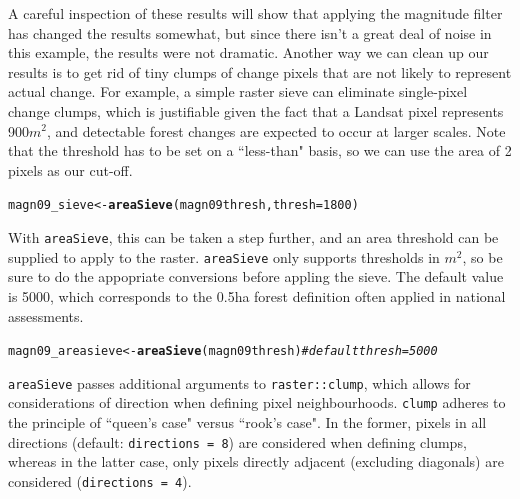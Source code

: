 \documentclass{article}\usepackage[]{graphicx}\usepackage[]{color}
\makeatletter
\newcommand{\hlnum}[1]{\textcolor[rgb]{0.686,0.059,0.569}{#1}}%
\newcommand{\hlcom}[1]{\textcolor[rgb]{0.678,0.584,0.686}{\textit{#1}}}%
\newcommand{\hlstd}[1]{\textcolor[rgb]{0.345,0.345,0.345}{#1}}%
\newcommand{\hlkwb}[1]{\textcolor[rgb]{0.69,0.353,0.396}{#1}}%
\newcommand{\hlkwc}[1]{\textcolor[rgb]{0.333,0.667,0.333}{#1}}%
\newcommand{\hlkwd}[1]{\textcolor[rgb]{0.737,0.353,0.396}{\textbf{#1}}}%
\newenvironment{kframe}{%
 \def\at@end@of@kframe{}%
 \ifinner\ifhmode%
  \def\at@end@of@kframe{\end{minipage}}%
  \begin{minipage}{\columnwidth}%
 \fi\fi%
 \def\FrameCommand##1{\hskip\@totalleftmargin \hskip-\fboxsep
 \colorbox{shadecolor}{##1}\hskip-\fboxsep
     \hskip-\linewidth \hskip-\@totalleftmargin \hskip\columnwidth}%
 \MakeFramed {\advance\hsize-\width
   \@totalleftmargin\z@ \linewidth\hsize
   \@setminipage}}%
 {\par\unskip\endMakeFramed%
 \at@end@of@kframe}
\newenvironment{knitrout}{}{} %
\def\code#1{\texttt{#1}}
\makeatother
\begin{document}
A careful inspection of these results will show that applying the magnitude filter has changed the results somewhat, but since there isn't a great deal of noise in this example, the results were not dramatic. Another way we can clean up our results is to get rid of tiny clumps of change pixels that are not likely to represent actual change. For example, a simple raster sieve can eliminate single-pixel change clumps, which is justifiable given the fact that a Landsat pixel represents 900$m^2$, and detectable forest changes are expected to occur at larger scales. Note that the threshold has to be set on a ``less-than" basis, so we can use the area of 2 pixels as our cut-off.

\begin{knitrout}
\color{fgcolor}\begin{kframe}
\begin{alltt}
\hlstd{magn09_sieve} \hlkwb{<-} \hlkwd{areaSieve}\hlstd{(magn09thresh,} \hlkwc{thresh} \hlstd{=} \hlnum{1800}\hlstd{)}
\end{alltt}


{\ttfamily\noindent\itshape\color{messagecolor}{\#\# Loading required package: igraph}}\end{kframe}
\end{knitrout}


With \code{areaSieve}, this can be taken a step further, and an area threshold can be supplied to apply to the raster. \code{areaSieve} only supports thresholds in $m^2$, so be sure to do the appopriate conversions before appling the sieve. The default value is 5000, which corresponds to the 0.5ha forest definition often applied in national assessments.

\begin{knitrout}
\color{fgcolor}\begin{kframe}
\begin{alltt}
\hlstd{magn09_areasieve} \hlkwb{<-} \hlkwd{areaSieve}\hlstd{(magn09thresh)}  \hlcom{# default thresh = 5000}
\end{alltt}
\end{kframe}
\end{knitrout}


\code{areaSieve} passes additional arguments to \code{raster::clump}, which allows for considerations of direction when defining pixel neighbourhoods. \code{clump} adheres to the principle of ``queen's case" versus ``rook's case". In the former, pixels in all directions (default: \code{directions = 8}) are considered when defining clumps, whereas in the latter case, only pixels directly adjacent (excluding diagonals) are considered (\code{directions = 4}).
\end{document}
